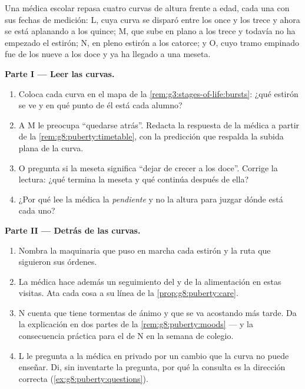\begin{problem}\label{pb:g8:puberty:1}
Una médica escolar repasa cuatro curvas de altura frente a edad, cada
una con sus fechas de medición: L, cuya curva se disparó entre los once
y los trece y ahora se está aplanando a los quince; M, que sube en
plano a los trece y todavía no ha empezado el estirón; N, en pleno
estirón a los catorce; y O, cuyo tramo empinado fue de los nueve a los
doce y ya ha llegado a una meseta.

\medskip\noindent\textbf{Parte I --- Leer las curvas.}
\begin{enumerate}
  \item Coloca cada curva en el mapa de la
        \cref{rem:g3:stages-of-life:bursts}: ¿qué estirón se ve y en
        qué punto de él está cada alumno?
  \item A M le preocupa ``quedarse atrás''. Redacta la respuesta de la
        médica a partir de la \cref{rem:g8:puberty:timetable}, con la
        predicción que respalda la subida plana de la curva.
  \item O pregunta si la meseta significa ``dejar de crecer a los
        doce''. Corrige la lectura: ¿qué termina la meseta y qué
        continúa después de ella?
  \item ¿Por qué lee la médica la \emph{pendiente} y no la altura para
        juzgar dónde está cada uno?
\end{enumerate}

\medskip\noindent\textbf{Parte II --- Detrás de las curvas.}
\begin{enumerate}[resume]
  \item Nombra la maquinaria que puso en marcha cada estirón y la ruta
        que siguieron sus órdenes.
  \item La médica hace además un seguimiento del  y de la
        alimentación en estas visitas. Ata cada cosa a su línea de la
        \cref{prop:g8:puberty:care}.
  \item N cuenta que tiene tormentas de ánimo y que se va acostando más
        tarde. Da la explicación en dos partes de la
        \cref{rem:g8:puberty:moods} --- y la consecuencia práctica para
        el  de N en la semana de colegio.
  \item L le pregunta a la médica en privado por un cambio que la curva
        no puede enseñar. Di, sin inventarte la pregunta, por qué la
        consulta es la dirección correcta
        (\cref{ex:g8:puberty:questions}).
\end{enumerate}


\end{problem}
